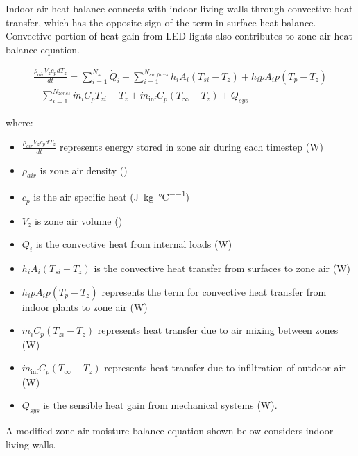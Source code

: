 Indoor air heat balance connects with indoor living walls through convective heat transfer, which has the opposite sign of the term in surface heat balance. Convective portion of heat gain from LED lights also contributes to zone air heat balance equation.

\begin{equation}
\begin{array}{l}\frac{{\rho_{air}}{V_z}{c_p}{dT_z}}{dt} = \sum\limits_{i = 1}^{{N_{sl}}} {\dot Q_i^{}}  + \sum\limits_{i = 1}^{{N_{surfaces}}} {{h_i}} {A_i} ({{T_{si}} - {T_z}}) + {{h_ip}}{A_ip}({{T_{p}} - {T_z}})\\ + \sum\limits_{i = 1}^{{N_{zones}}} {{{\dot m}_i}} {C_p}{{T_{zi}} - {T_z}} + {\dot m_{\inf }}{C_p}( {{T_\infty } - {T_z}}) +{\dot Q_{sys}}\end{array}
\end{equation}

where:

\begin{itemize}
\tightlist
\item
  $\frac{\rho_{air} V_z c_p dT_z}{dt}$ represents energy stored in zone air during each timestep (\si{\watt})
\item
  $\rho_{air}$ is zone air density (\si{\density})
\item
  $c_p$ is the air specific heat (\si{\J\per\kg\per\celsius})
\item
  $V_z$ is zone air volume (\si{\volume})
\item
  \(\dot Q_i\) is the convective heat from internal loads (\si{\watt})
\item
  \({{h_i}} {A_i}\left( {{T_{si}} - {T_z}} \right)\) is the convective heat transfer from surfaces to zone air (\si{\watt})
\item
  \({{h_ip}} {A_ip}\left( {{T_{p}} - {T_z}} \right)\) represents the term for convective heat transfer from indoor plants to zone air (\si{\watt})
\item
  \({{{\dot m}_i}} {C_p}\left( {{T_{zi}} - {T_z}} \right)\) represents heat transfer due to air mixing between zones (\si{\watt})
\item
  \({\dot m_{\inf }}{C_p}\left( {{T_\infty } - {T_z}} \right)\) represents heat transfer due to infiltration of outdoor air (\si{\watt})
\item
  \(\dot Q_{sys}\) is the sensible heat gain from mechanical systems (\si{\watt}).
\end{itemize}

A modified zone air moisture balance equation shown below considers indoor living walls.

